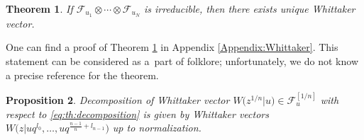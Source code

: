 \documentclass[pdftex]{sigma}
\numberwithin{equation}{section}
\newtheorem{Theorem}{Theorem}[section]
\newtheorem{Proposition}[Theorem]{Proposition}
\theoremstyle{definition}
\begin{document}
\begin{Theorem} \label{th:Whittaker condition}
If $\mathcal{F}_{u_1} \otimes \cdots \otimes \mathcal{F}_{u_N}$ is irreducible, then there exists unique Whittaker vector.
\end{Theorem}

One can find a proof of Theorem \ref{th:Whittaker condition} in Appendix \ref{Appendix:Whittaker}. This statement can be considered as a~part of folklore; unfortunately, we do not know a precise reference for the theorem.

\begin{Proposition} \label{prop: Whit up to norm}
Decomposition of Whittaker vector $W\big(z^{1/n}|u\big) \in \mathcal{F}^{[1/n]}_{u}$ with respect to \eqref{eq:th:decomposition} is given by Whittaker vectors $W\big(z | u q^{ l_0}, \dots ,u q^{\frac{n-1}{n}+ l_{n-1}}\big)$ up to normalization.
\end{Proposition}
\end{document}
